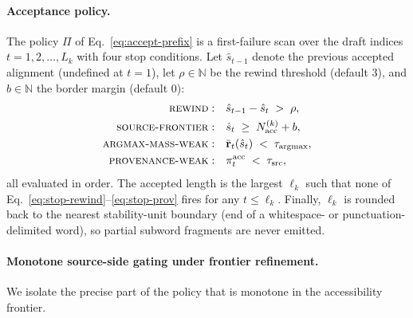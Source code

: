 \documentclass[11pt,twocolumn]{article}
\begin{document}
\paragraph{Acceptance policy.}
The policy $\Pi$ of Eq.~\eqref{eq:accept-prefix} is a first-failure scan
over the draft indices $t = 1, 2, \ldots, L_k$ with four stop conditions.
Let $\hat{s}_{t-1}$ denote the previous accepted alignment (undefined at
$t=1$), let $\rho \in \mathbb{N}$ be the rewind threshold
(default $3$), and $b \in \mathbb{N}$ the border margin (default $0$):
\begin{align}
  \text{\textsc{rewind}} :\quad
  &\hat{s}_{t-1} - \hat{s}_t \;>\; \rho,
  \label{eq:stop-rewind}\\
  \text{\textsc{source-frontier}} :\quad
  &\hat{s}_t \;\geq\; N^{(k)}_{\mathrm{acc}} + b,
  \label{eq:stop-frontier}\\
  \text{\textsc{argmax-mass-weak}} :\quad
  &\bar{\mathbf{r}}_t(\hat{s}_t) \;<\; \tau_{\mathrm{argmax}},
  \label{eq:stop-argmax}\\
  \text{\textsc{provenance-weak}} :\quad
  &\pi_t^{\mathrm{acc}} \;<\; \tau_{\mathrm{src}},
  \label{eq:stop-prov}
\end{align}
all evaluated in order. The accepted length is the largest
$\ell_k$ such that none of
Eq.~\eqref{eq:stop-rewind}--\eqref{eq:stop-prov} fires for any
$t \leq \ell_k$. Finally, $\ell_k$ is rounded back to the nearest
stability-unit boundary (end of a whitespace- or punctuation-delimited
word), so partial subword fragments are never emitted.

\paragraph{Monotone source-side gating under frontier refinement.}
We isolate the precise part of the policy that is monotone in the accessibility
frontier.
\end{document}
